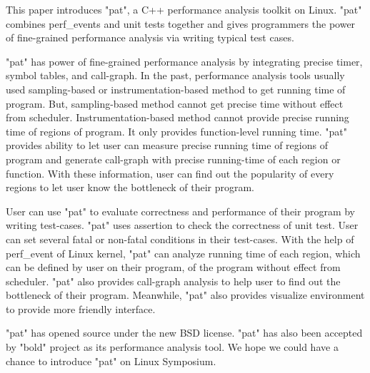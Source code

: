This paper introduces "pat", a C++ performance analysis toolkit on Linux.
"pat" combines perf_events and unit tests together and gives programmers the power of fine-grained performance analysis via writing typical test cases.

"pat" has power of fine-grained performance analysis by integrating precise timer, symbol tables, and call-graph.
In the past, performance analysis tools usually used sampling-based or instrumentation-based method to get running time of program. But, sampling-based method cannot get precise time without effect from scheduler. Instrumentation-based method cannot provide precise running time of regions of program. It only provides function-level running time. 
"pat" provides ability to let user can measure precise running time of regions of program and generate call-graph with precise running-time of each region or function. 
With these information, user can find out the popularity of every regions to let user know the bottleneck of their program.

User can use "pat" to evaluate correctness and performance of their program by writing test-cases.
"pat" uses assertion to check the correctness of unit test. 
User can set several fatal or non-fatal conditions in their test-cases.
With the help of perf_event of Linux kernel, "pat" can analyze running time of each region, which can be defined by user on their program, of the program without effect from scheduler. 
"pat" also provides call-graph analysis to help user to find out the bottleneck of their program. 
Meanwhile, "pat" also provides visualize environment to provide more friendly interface.

"pat" has opened source under the new BSD license. 
"pat" has also been accepted by "bold" project as its performance analysis tool.
We hope we could have a chance to introduce "pat" on Linux Symposium.
